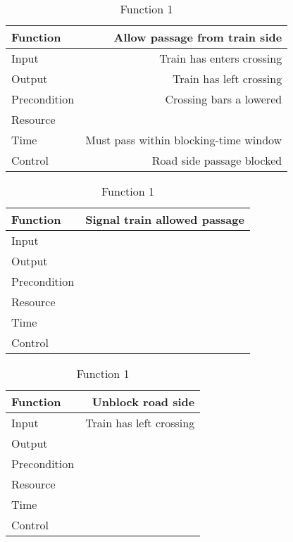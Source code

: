 \begin{table}[h]
\centering
    \begin{tabular}{ | l | r | }
    \hline
    Function     &  Allow passage from train side \\ \hline \hline
    Input        &  Train has enters crossing\\ \hline
    Output       &  Train has left crossing\\ \hline
    Precondition &  Crossing bars a lowered\\ \hline
    Resource     &  \\ \hline
    Time         &  Must pass within blocking-time window\\ \hline
    Control      &  Road side passage blocked\\ \hline
    \end{tabular}
\caption{Function 1}
\label{table:function0}
\end{table}

\begin{table}[h]
\centering
    \begin{tabular}{ | l | r | }
    \hline
    Function     &  Signal train allowed passage \\ \hline \hline
    Input        &  \\ \hline
    Output       &  \\ \hline
    Precondition &  \\ \hline
    Resource     &  \\ \hline
    Time         &  \\ \hline
    Control      &  \\ \hline
    \end{tabular}
\caption{Function 1}
\label{table:function1}
\end{table}

\begin{table}[h]
\centering
    \begin{tabular}{ | l | r | }
    \hline
    Function     &  Unblock road side \\ \hline \hline
    Input        &  Train has left crossing\\ \hline
    Output       &  \\ \hline
    Precondition &  \\ \hline
    Resource     &  \\ \hline
    Time         &  \\ \hline
    Control      &  \\ \hline
    \end{tabular}
\caption{Function 1}
\label{table:function2}
\end{table}


